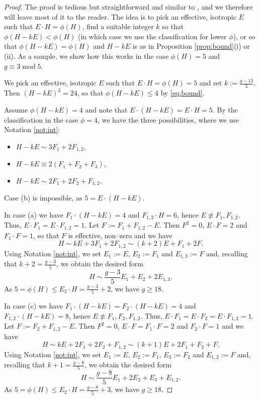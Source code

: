 \documentclass[11pt]{amsart}
\theoremstyle{definition}
\begin{document}
\begin{proof}
  The proof is tedious but straightforward and similar to  \cite[pf. of Prop. 1.4 in \S 2.2]{KL1},  and we therefore will leave most of it to the reader.  The idea is to pick an effective, isotropic $E$ such that $E \cdot H=\phi(H)$, find a suitable integer $k$ so that $\phi(H-kE) < \phi(H)$ (in which case we use the classification for lower $\phi$), or so that $\phi(H-kE)=\phi(H)$ and $H-kE$ is as in Proposition \ref{prop:bound}(i) or (ii). As a sample, we show how this works in the case $\phi(H)=5$ and $g \equiv 3 \; \mbox{mod} \; 5$. 

We pick an effective, isotropic $E$ such that $E \cdot H=\phi(H)=5$ and set $k:=\frac{g-13}{5}$. Then $(H-kE)^2=24$, so that $\phi(H-kE) \leqslant 4$ by \eqref{eq:bound}.   \medskip

Assume $\phi(H-kE) = 4$ and note that $E\cdot (H-kE)=E\cdot H=5$. By the classification in the case $\phi=4$, we have the three possibilities, where we use Notation \ref{not:int}:
\begin{itemize}
\item[(a)] $H-kE \sim 3F_1+2F_{1,2}$,
 \item[(b)] $H-kE  \equiv   2(F_1+F_2+F_3)$, 
\item[(c)] $H-kE \sim 2F_1+2F_2+F_{1,2}$.
\end{itemize}

Case (b) is impossible, as $5=E \cdot (H-kE)$.  

In case (a) we have $F_1 \cdot (H-kE)=4$ and $F_{1,2} \cdot H=6$, hence $E \not \equiv F_1,F_{1,2}$. Thus, $E \cdot F_1=E \cdot F_{1,2}=1$. Let $F:=F_1+F_{1,2}-E$. Then $F^2=0$, $E \cdot F=2$ and $F_1 \cdot F=1$, so that $F$ is effective, non--zero and we have
\[H \sim kE+3F_1+2F_{1,2} \sim (k+2)E+F_1+2F.\]
Using Notation \ref{not:int}, we set $E_1:=E$, $E_2:=F_1$ and $E_{1,3}:=F$ and, recalling that $k+2=\frac{g-3}{5}$, we obtain the desired form
\begin{equation} \label{eq:form1} 
 H \sim \frac{g-3}{5}E_1+E_2+2E_{1,3}.
\end{equation}
As $5 =\phi(H) \leqslant E_2 \cdot H=\frac{g-3}{5}+2$, we have $g \geqslant 18$. 

In case (c) we have $F_1 \cdot (H-kE)=F_2 \cdot (H-kE)=4$ and $F_{1,2} \cdot (H-kE)=8$, hence $E \not \equiv F_1,F_2,F_{1,2}$. Thus, $E \cdot F_1=E \cdot F_2 = E \cdot F_{1,2}=1$. Let $F:=F_2+F_{1,2}-E$. Then $F^2=0$, $E \cdot F=F_1 \cdot F=2$
and $F_2 \cdot F=1$ and we have
\[ H \sim kE+2F_1+2F_2+F_{1,2} \sim (k+1)E+2F_1+F_2+F.\]
Using Notation \ref{not:int}, we set $E_1:=E$, $E_2:=F_1$, $E_3:=F_2$ and $E_{1,2}:=F$ and, recalling that $k+1=\frac{g-8}{5}$, we obtain the desired form
\begin{equation} \label{eq:form2} 
H \sim \frac{g-8}{5}E_1+2E_2+E_3+E_{1,2}.
\end{equation}
As $5 =\phi(H) \leqslant E_2 \cdot H=\frac{g-8}{5}+3$, we have $g \geqslant 18$.


\end{proof}
\end{document}
